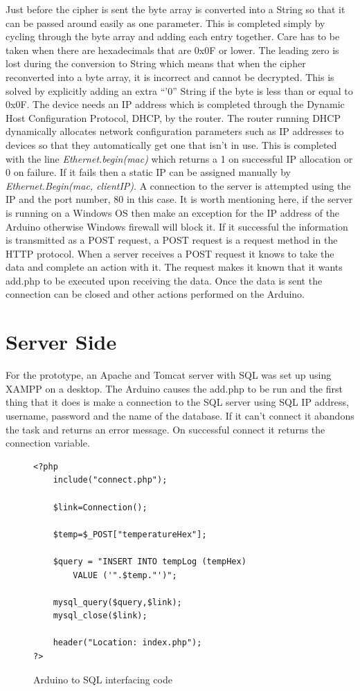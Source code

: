  Just before the cipher is sent the byte array is converted into a String so that it can be passed around easily as one parameter. This is completed simply by cycling through the byte array and adding each entry together. Care has to be taken when there are hexadecimals that are 0x0F or lower. The leading zero is lost during the conversion to String which means that when the cipher reconverted into a byte array, it is incorrect and cannot be decrypted. This is solved by explicitly adding an extra ``'0'' String if the byte is less than or equal to 0x0F.  The device needs an IP address which is completed through the Dynamic Host Configuration Protocol, DHCP, by the router. The router running DHCP dynamically allocates network configuration parameters such as IP addresses to devices so that they automatically get one that isn't in use. This is completed with the line \emph{Ethernet.begin(mac)} which returns a 1 on successful IP allocation or 0 on failure. If it fails then a static IP can be assigned manually by \emph{Ethernet.Begin(mac, clientIP)}. A connection to the server is attempted using the IP and the port number, 80 in this case. It is worth mentioning here, if the server is running on a Windows OS then make an exception for the IP address of the Arduino otherwise Windows firewall will block it. If it successful the information is transmitted as a POST request, a POST request is a request method in the HTTP protocol. When a server receives a POST request it knows to take the data and complete an action with it. The request makes it known that it wants add.php to be executed upon receiving the data. %
Once the data is sent the connection can be closed and other actions performed on the Arduino.
 
\section{Server Side}

For the prototype, an Apache and Tomcat server with SQL was set up using XAMPP on a desktop. The Arduino causes the add.php to be run and the first thing that it does is make a connection to the SQL server using SQL IP address, username, password and the name of the database. If it can't connect it abandons the task and returns an error message. On successful connect it returns the connection variable.

\begin{figure}[H]
\begin{lstlisting}[style=PHP]
<?php
   	include("connect.php");
 
   	$link=Connection();
	
	$temp=$_POST["temperatureHex"];
 
	$query = "INSERT INTO tempLog (tempHex) 
		VALUE ('".$temp."')"; 
 
   	mysql_query($query,$link);
   	mysql_close($link);
 
   	header("Location: index.php");
?>
\end{lstlisting}
\caption{Arduino to SQL interfacing code}
\label{snip:php}
\end{figure}

